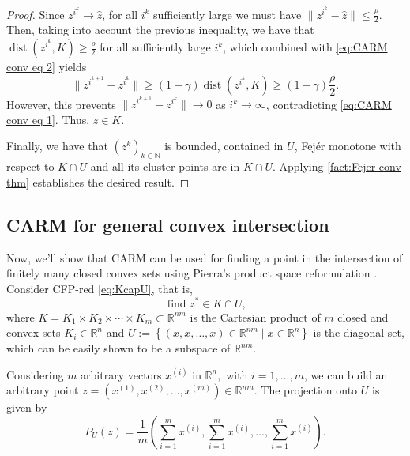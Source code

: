 \documentclass[smallextended,numbook,nospthms]{svjour3}
\theoremstyle{plain}
\theoremstyle{definition}
\def\RR{\mathds R}
\def\NN{\mathds N}
\DeclareMathOperator{\Fix}{Fix}
\DeclareMathOperator{\dist}{dist}
\begin{document}
\begin{proof}
	Since $z^{i^{k}} \rightarrow \hat{z}$, for all $i^{k}$ sufficiently large we must have $\|z^{i^{k}}-\hat{z}\|\leq \frac{\rho}{2}$. Then, taking into account the previous inequality, we have that $\dist(z^{i^{k}},K)\geq \frac{\rho}{2}$ for all sufficiently large $i^{k}$, which combined with \cref{eq:CARM conv eq 2} yields
	$$
	\|z^{i^{k+1}}-z^{i^{k}}\|\geq (1-\gamma) \dist(z^{i^{k}},K) \geq (1-\gamma)\frac{\rho}{2}.
	$$
	However, this prevents $\|z^{i^{k+1}}-z^{i^{k}}\| \rightarrow 0$ as $i^{k} \rightarrow \infty$, contradicting \cref{eq:CARM conv eq 1}.
	Thus, $\hat{z} \in K$.
	
	Finally, we have that $\left(z^{k}\right)_{k \in \NN}$ is bounded, contained in $U$, Fejér monotone with respect to $K \cap U$  and all its cluster points are in $K \cap U$. Applying \cref{fact:Fejer conv thm} establishes the desired result.
\end{proof}

\subsection{CARM for general convex intersection}

Now, we'll show that CARM can be used for finding a point in the intersection of finitely many closed convex sets using Pierra's product space reformulation \cite{Pierra:1984hl}. Consider CFP-red \cref{eq:KcapU}, that is,
\[
\text{ find } z^{*}\in K\cap U, 
\]
where $K=K_{1} \times K_{2} \times \cdots \times K_{m}\subset \RR^{nm}$ is the Cartesian product of $m$ closed and convex sets $K_{i} \in \RR^n$ and $U :=\left\{(x, x, \ldots, x) \in \RR^{nm} \mid x \in \RR^{n}\right\}$ is the diagonal set, which can be easily shown to be a subspace of $\RR^{nm}$.

Considering $m$ arbitrary vectors $x^{(i)}$ in $\RR^{n},$ with $i=1, \ldots, m$, we can build an arbitrary point $z=\left(x^{(1)}, x^{(2)}, \ldots, x^{(m)}\right) \in \RR^{nm}$. The projection onto $U$ is given by
\begin{equation}
P_{U}(z)=\frac{1}{m}\left(\sum_{i=1}^{m} x^{(i)}, \sum_{i=1}^{m} x^{(i)}, \ldots, \sum_{i=1}^{m} x^{(i)}\right).
\end{equation}
\label{Pierra P_{U}}
\end{document}
